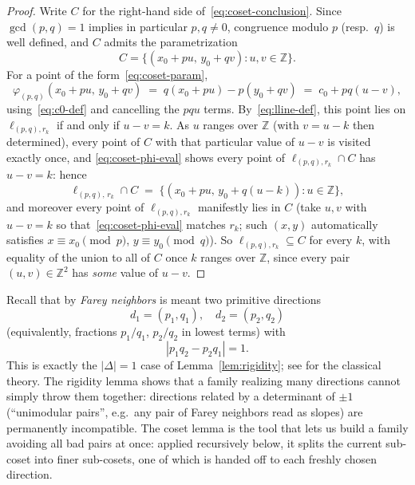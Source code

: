 \documentclass[a4paper,11pt,oneside,reqno]{amsart}
\theoremstyle{definition}
\theoremstyle{remark}
\theoremstyle{plain}
\newcommand{\Z}{\mathbb{Z}}
\begin{document}
\begin{proof}
  Write \(C\) for the right-hand side of~\eqref{eq:coset-conclusion}. Since \(\gcd(p,q)=1\) implies in
  particular \(p,q\ne0\), congruence modulo \(p\) (resp.\ \(q\)) is well defined, and \(C\) admits the
  parametrization
  \begin{equation}
    \label{eq:coset-param}
    C = \{(x_0+pu,\,y_0+qv) : u,v\in\Z\}.
  \end{equation}
  For a point of the form~\eqref{eq:coset-param},
  \begin{equation}
    \label{eq:coset-phi-eval}
    \varphi_{(p,q)}(x_0+pu,\,y_0+qv) \;=\; q(x_0+pu)-p(y_0+qv) \;=\; c_0 + pq(u-v),
  \end{equation}
  using~\eqref{eq:c0-def} and cancelling the \(pqu\) terms. By~\eqref{eq:lline-def}, this point lies
  on \(\ell_{(p,q),r_k}\) if and only if \(u-v=k\). As \(u\) ranges over \(\Z\) (with \(v=u-k\) then
  determined), every point of \(C\) with that particular value of \(u-v\) is visited exactly once, and
  \eqref{eq:coset-phi-eval} shows every point of \(\ell_{(p,q),r_k}\cap C\) has \(u-v=k\): hence
  \begin{equation}
    \label{eq:coset-single-level}
    \ell_{(p,q),\,r_k} \cap C \;=\; \{(x_0+pu,\,y_0+q(u-k)) : u\in\Z\},
  \end{equation}
  and moreover every point of \(\ell_{(p,q),r_k}\) manifestly lies in \(C\) (take \(u,v\) with
  \(u-v=k\) so that~\eqref{eq:coset-phi-eval} matches \(r_k\); such \((x,y)\) automatically satisfies
  \(x\equiv x_0\pmod p\), \(y\equiv y_0\pmod q\)). So \(\ell_{(p,q),r_k}\subseteq C\) for every \(k\),
  with equality of the union to all of \(C\) once \(k\) ranges over \(\Z\), since every pair \((u,v)\in\Z^2\)
  has \emph{some} value of \(u-v\).
\end{proof}


Recall that by \emph{Farey neighbors} is meant two primitive directions
\[d_1=(p_1,q_1), \quad d_2=(p_2,q_2)\]
(equivalently, fractions \(p_1/q_1\), \(p_2/q_2\) in lowest
terms) with
\[|p_1q_2-p_2q_1|=1.\]
This is exactly the \(|\Delta|=1\) case of
Lemma~\ref{lem:rigidity}; see \cite[Ch.~III]{HardyWright2008} for the classical theory.
The rigidity lemma shows that a family realizing many directions cannot simply throw them
together: directions related by a determinant of \(\pm1\) (``unimodular pairs'', e.g.\ any pair of
Farey neighbors read as slopes) are permanently incompatible. The coset lemma is the tool that lets
us build a family avoiding all bad pairs at once: applied recursively below, it splits the current
sub-coset into finer sub-cosets, one of which is handed off to each freshly chosen direction.
\end{document}
